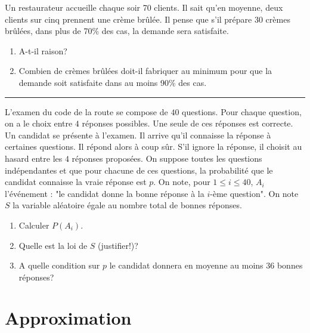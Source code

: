 \documentclass[../PolyS4.tex]{subfiles}
\begin{document}
Un restaurateur accueille chaque soir 70 clients. Il sait qu'en moyenne, deux clients sur cinq prennent une crème brûlée. Il pense que s'il prépare 30 crèmes brûlées, dans plus de 70\% des cas, la demande sera satisfaite.
\begin{enumerate}
\item A-t-il raison?
\item Combien de crèmes brûlées doit-il fabriquer au minimum pour que la demande soit satisfaite dans au moins 90\% des cas.\\
\end{enumerate}

\hfill\break
\hrule
\hfill\break



L'examen du code de la route se compose de $40$ questions. Pour chaque question, on a le choix entre $4$ réponses possibles. Une seule de ces réponses est correcte. Un candidat se présente à l'examen. Il arrive qu'il connaisse la réponse
à certaines questions. Il répond alors à coup sûr. S'il ignore la réponse, il choisit au hasard entre les $4$ réponses proposées. On suppose toutes les questions indépendantes et que pour chacune de ces questions, la probabilité que le candidat connaisse la vraie réponse est $p$. On note, pour $1\leq i\leq 40$, $A_i$ l'événement : "le candidat donne la bonne réponse à la $i$-ème 
question". On note $S$ la variable aléatoire égale au nombre total de bonnes réponses.
\begin{enumerate}
\item Calculer $P(A_i)$.
\item Quelle est la loi de $S$ (justifier!)?
\item A quelle condition sur $p$ le candidat donnera en moyenne au moins $36$ bonnes réponses?\\
\end{enumerate}






\section{Approximation}


\end{document}
